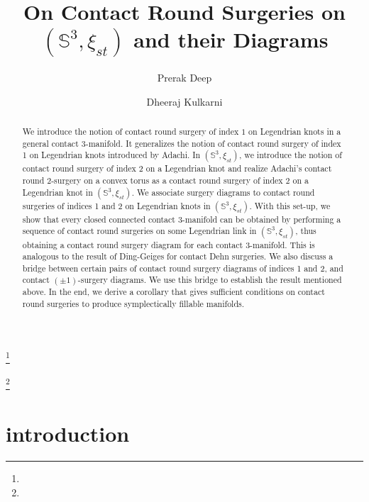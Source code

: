 \documentclass{amsart}
\theoremstyle{plain}
\theoremstyle{remark}
\theoremstyle{definition}
\newcommand{\s}{\mathbb{S}}
\begin{document}
\title{On Contact Round Surgeries on $(\mathbb{S}^3, \xi_{st})$ and their Diagrams}

\author{Prerak Deep}
\address{Department of Mathematics, Indian Institute of Science Education and Research Bhopal}
\curraddr{}
\thanks{}

\author{Dheeraj Kulkarni}
\address{Department of Mathematics,  Indian Institute of Science Education and Research Bhopal}
\curraddr{}
\thanks{}



\date{}

\dedicatory{}


\begin{abstract}
We introduce the notion of contact round surgery of index $1$ on Legendrian knots in a general contact 3-manifold. It generalizes the notion of contact round surgery of index 1 on Legendrian knots introduced by Adachi. In $\left(\mathbb{S}^3, \xi_{st}\right)$, we introduce the notion of contact round 
surgery of index 2 on a Legendrian knot and realize Adachi's contact round 2-surgery on a convex torus as a contact round surgery of index $2$ on a Legendrian knot in $\left(\s^3, \xi_{st}\right)$. 
We associate surgery diagrams to contact round surgeries of indices 1 and 2 on Legendrian knots in $\left(\mathbb{S}^3, \xi_{st}\right)$. With this set-up, we show that every closed connected contact 3-manifold can be obtained by 
performing a sequence of contact round surgeries on some Legendrian link in $\left(\mathbb{S}^3, \xi_{st}\right)$, thus obtaining a contact round surgery 
diagram for each contact 3-manifold. This is analogous to the result of Ding-Geiges for contact Dehn surgeries. We also discuss a bridge between certain 
pairs of contact round surgery diagrams of indices 1 and 2, and contact $(\pm1)$-surgery diagrams. We use this bridge to establish the result mentioned above. In 
the end, we derive a corollary that gives sufficient conditions on contact round surgeries to produce symplectically fillable manifolds.

    
\end{abstract}

\maketitle

\section{introduction}
\end{document}
